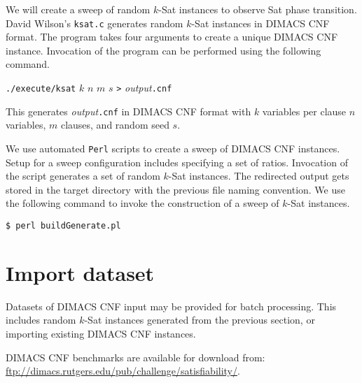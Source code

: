 	We will create a sweep of random $k$-{\sc Sat} instances to observe {\sc Sat} phase transition.  David Wilson's \texttt{ksat.c} generates random $k$-{\sc Sat} instances in DIMACS CNF format.  The program takes four arguments to create a unique DIMACS CNF instance.  Invocation of the program can be performed using the following command.

\begin{center}

\texttt{./execute/ksat} $k$ $n$ $m$ $s$ \texttt{>} \textit{output}\texttt{.cnf}

\end{center}

This generates \textit{output}\texttt{.cnf} in DIMACS CNF format with $k$ variables per clause $n$ variables, $m$ clauses, and random seed $s$.


We use automated \texttt{Perl} scripts to create a sweep of DIMACS CNF instances.  Setup for a sweep configuration includes specifying a set of ratios.  Invocation of the script generates a set of random $k$-{\sc Sat} instances.  The redirected output gets stored in the target directory with the previous file naming convention.  We use the following command to invoke the construction of a sweep of $k$-{\sc Sat} instances.


\begin{center}

\texttt{\$ perl buildGenerate.pl}

\end{center}






	\section{Import dataset}


Datasets of DIMACS CNF input may be provided for batch processing.  This includes random $k$-{\sc Sat} instances generated from the previous section, or importing existing DIMACS CNF instances.   


DIMACS CNF benchmarks are available for download from: \url{ftp://dimacs.rutgers.edu/pub/challenge/satisfiability/}.


